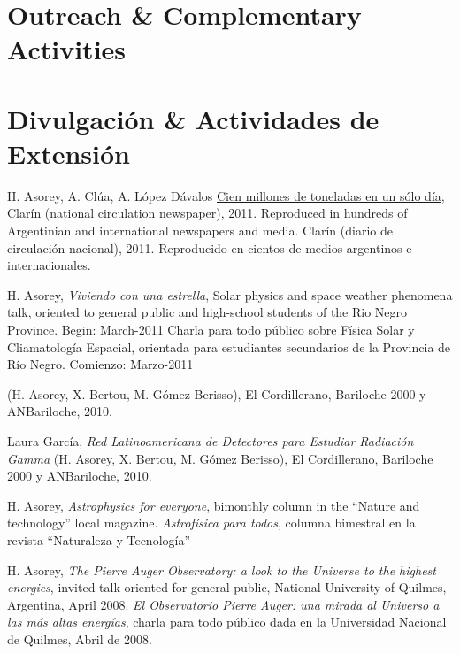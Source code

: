 \ifeng
\section*{Outreach \& Complementary Activities}
\else
\section*{Divulgación \& Actividades de Extensión}
\fi
\noindent
{}H. Asorey, A. Clúa, A. López Dávalos \href{http://www.clarin.com/sociedad/Cien-millones-toneladas-cenizas-solo_0_517148395.html}{Cien millones de toneladas en un sólo día}, 
\ifeng
Clarín (national circulation newspaper), 2011. Reproduced in hundreds of Argentinian and international newspapers and media.
\else
Clarín (diario de circulación nacional), 2011. Reproducido en cientos de medios argentinos e internacionales.
\fi

H. Asorey, {\emph{Viviendo con una estrella}}, 
\ifeng 
Solar physics and space weather phenomena talk, oriented to general public and high-school students of the Rio Negro Province. Begin: March-2011
\else
Charla para todo público sobre Física Solar y Cliamatología Espacial, orientada para estudiantes secundarios de la Provincia de Río Negro. Comienzo: Marzo-2011
\fi

 (H. Asorey, X. Bertou, M. Gómez Berisso), El Cordillerano, Bariloche 2000 y ANBariloche, 2010.

Laura García, {\emph{Red Latinoamericana de Detectores para Estudiar Radiación Gamma}} (H. Asorey, X. Bertou, M. Gómez Berisso), El Cordillerano, Bariloche 2000 y ANBariloche, 2010.

H. Asorey, 
\ifeng
{\emph{Astrophysics for everyone}}, bimonthly column in the ``Nature and technology'' local magazine. \else
{\emph{Astrofísica para todos}}, columna bimestral en la revista ``Naturaleza y Tecnología''
\fi

H. Asorey, 
\ifeng
{\emph{The Pierre Auger Observatory: a look to the Universe to the highest energies}}, invited talk oriented for general public, National University of Quilmes, Argentina, April 2008.
\else
{\emph{El Observatorio Pierre Auger: una mirada al Universo a las más altas energías}}, charla para todo público dada en la Universidad Nacional de Quilmes, Abril de 2008.
\fi

